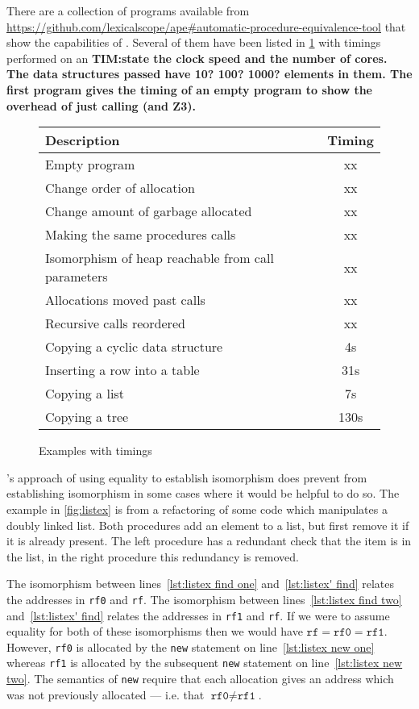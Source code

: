 \documentclass[runningheads,a4paper]{llncs}
\makeatletter
\newcommand*{\ie}{i.e.\@\xspace}
\makeatother
\begin{document}
There are a collection of programs available from \url{https://github.com/lexicalscope/ape#automatic-procedure-equivalence-tool} that show the capabilities of \tool{}. Several of them have been listed in \cref{fig:progs} with timings performed on an {\bf TIM:state the clock speed and the number of cores. The data structures passed have 10? 100? 1000? elements in them. The first program gives the timing of an empty program to show the overhead of just calling \tool{} (and Z3).
}

\begin{figure}[htbp]
\centering%
\begin{tabular}{| l | c |  }

\hline	
  {\bf Description} & {\bf Timing}\\
\hline
  Empty program & xx \\		
  Change order of allocation & xx  \\
  Change amount of garbage allocated & xx  \\
  Making the same procedures calls & xx \\
  Isomorphism of heap reachable from call parameters & xx \\
  Allocations moved past calls & xx\\
  Recursive calls reordered & xx\\
  Copying a cyclic data structure & 4s \\
  Inserting a row into a table  & 31s \\
  Copying a list & 7s \\
  Copying a tree & 130s  \\
  \hline  

\end{tabular}
\caption{Examples with timings}\label{fig:progs}
\end{figure}
\metho{}'s approach of using equality to establish isomorphism does prevent \tool{} from establishing isomorphism in some cases where it would be helpful to do so. The example in \cref{fig:listex} is from a refactoring of some code which manipulates a doubly linked list. Both procedures add an element to a list, but first remove it if it is already present. The left procedure has a redundant check that the item is in the list, in the right procedure this redundancy is removed.

The isomorphism between lines~\ref{lst:listex find one} and~\ref{lst:listex' find} relates the addresses in \texttt{rf0} and \texttt{rf}. The isomorphism between lines~\ref{lst:listex find two} and~\ref{lst:listex' find} relates the addresses in \texttt{rf1} and \texttt{rf}. If we were to assume equality for both of these isomorphisms then we would have $\texttt{rf} = \texttt{rf0} = \texttt{rf1}$. However, \texttt{rf0} is allocated by the \texttt{new} statement on line~\ref{lst:listex new one} whereas \texttt{rf1} is allocated by the subsequent \texttt{new} statement on line~\ref{lst:listex new two}. The semantics of \texttt{new} require that each allocation gives an address which was not previously allocated --- \ie that $\texttt{rf0} \neq \texttt{rf1}$.
\end{document}
